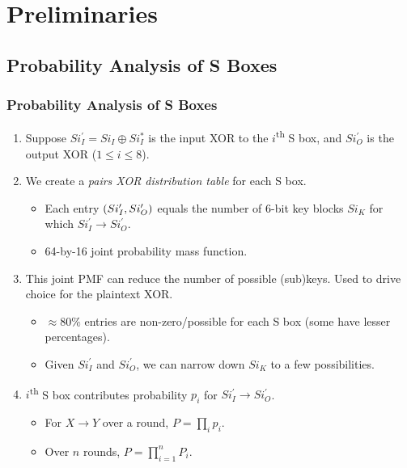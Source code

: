 \documentclass{beamer}
\begin{document}
    \section{Preliminaries}    
    \label{sec:prelims}

    \subsection[S Boxes]{Probability Analysis of S Boxes}
    \label{subsec:s-boxes}
    
    \begin{frame}
        \frametitle{Probability Analysis of S Boxes}
        \begin{enumerate}
            \item Suppose \(Si_I^\prime = Si_I \oplus Si_I^*\) is the input XOR
            to the \(i\)\textsuperscript{th} S box, and \(Si_O^\prime\) is the
            output XOR (\(1 \le i \le 8\)).
            \item<2-> We create a \emph{pairs XOR distribution table} for each S
            box.
            \begin{itemize}
                \item Each entry \((Si_I^\prime, Si_O^\prime)\) equals the
                number of 6-bit key blocks \(Si_K\) for which \(Si_I^\prime
                \rightarrow Si_O^\prime\).
                \item 64-by-16 joint probability mass function.
            \end{itemize}
            \item<3-> This joint PMF can reduce the number of possible
            (sub)keys. Used to drive choice for the plaintext XOR.
            \begin{itemize}
                \item \(\approx 80\%\) entries are non-zero/possible for each S
                box (some have lesser percentages).
                \item Given \(Si_I^\prime\) and \(Si_O^\prime\), we can narrow
                down \(Si_K\) to a few possibilities.
            \end{itemize}
            \item<4-> \(i\)\textsuperscript{th} S box contributes probability
            \(p_i\) for \(Si_I^\prime \rightarrow Si_O^\prime\). 
            \begin{itemize}
                \item For \(X \rightarrow Y\) over a round, \(P = \prod_i p_i\).
                \item Over \(n\) rounds, \(P = \prod_{i=1}^n P_i\).
            \end{itemize}
        \end{enumerate}
    \end{frame}
\end{document}
